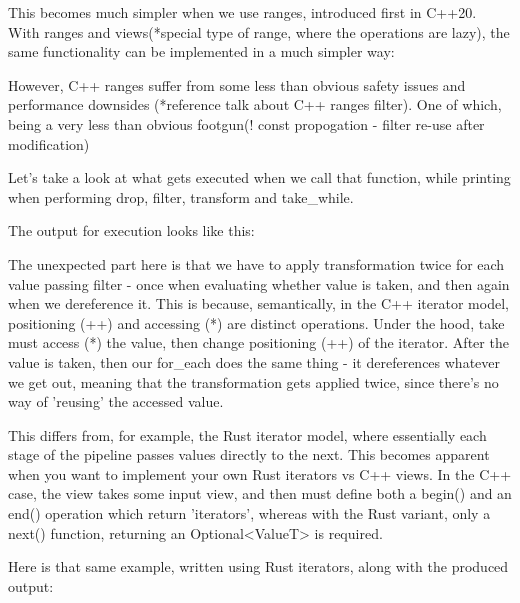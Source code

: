 \documentclass[
    english, %
]{VUMIFPSkursinis}
\begin{document}
This becomes much simpler when we use ranges, introduced first in C++20. With ranges and views(*special type of range, where the operations are lazy), the same functionality can be implemented in a much simpler way:


However, C++ ranges suffer from some less than obvious safety issues and performance downsides (*reference talk about C++ ranges filter). One of which, being a very less than obvious footgun(! const propogation - filter re-use after modification)

Let's take a look at what gets executed when we call that function, while printing when performing drop, filter, transform and take\_while.


The output for execution looks like this:


The unexpected part here is that we have to apply transformation twice for each value passing filter - once when evaluating whether value is taken, and then again when we dereference it.
This is because, semantically, in the C++ iterator model, positioning (++) and accessing (*) are distinct operations. Under the hood, take must access (*) the value, then change positioning (++) of the iterator.
After the value is taken, then our for\_each does the same thing - it dereferences whatever we get out, meaning that the transformation gets applied twice, since there's no way of 'reusing' the accessed value.

This differs from, for example, the Rust iterator model, where essentially each stage of the pipeline passes values directly to the next. This becomes apparent when you want to implement your own Rust iterators vs C++ views. In the C++ case, the view takes some input view, and then must define both a begin() and an end() operation which return 'iterators', whereas with the Rust variant, only a next() function, returning an Optional<ValueT> is required.

Here is that same example, written using Rust iterators, along with the produced output:

\inputminted[]{Rust}{./source_code/ranges_for_loop_filter_view_perf_example.rs}

\end{document}
